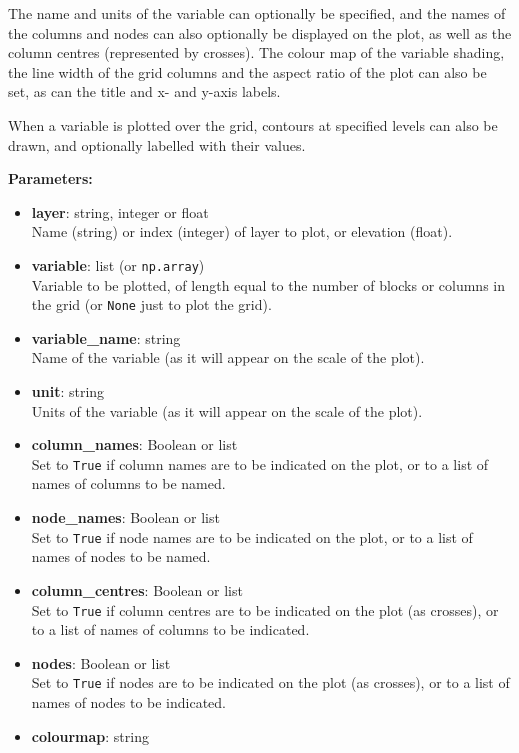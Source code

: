 The name and units of the variable can optionally be specified, and the names of the columns and nodes can also optionally be displayed on the plot, as well as the column centres (represented by crosses).  The colour map of the variable shading, the line width of the grid columns and the aspect ratio of the plot can also be set, as can the title and x- and y-axis labels.

When a variable is plotted over the grid, contours at specified levels can also be drawn, and optionally labelled with their values.

\textbf{Parameters:}
\begin{itemize}
\item \textbf{layer}: string, integer or float\\
  Name (string) or index (integer) of layer to plot, or elevation (float).
\item \textbf{variable}: list (or \texttt{np.array})\\
  Variable to be plotted, of length equal to the number of blocks or columns in the grid (or \texttt{None} just to plot the grid).
\item \textbf{variable\_name}: string\\
  Name of the variable (as it will appear on the scale of the plot).
\item \textbf{unit}: string\\
  Units of the variable (as it will appear on the scale of the plot).
\item \textbf{column\_names}: Boolean or list\\
  Set to \texttt{True} if column names are to be indicated on the plot, or to a list of names of columns to be named.
\item \textbf{node\_names}: Boolean or list\\
  Set to \texttt{True} if node names are to be indicated on the plot, or to a list of names of nodes to be named.
\item \textbf{column\_centres}: Boolean or list\\
  Set to \texttt{True} if column centres are to be indicated on the plot (as crosses), or to a list of names of columns to be indicated.
\item \textbf{nodes}: Boolean or list\\
  Set to \texttt{True} if nodes are to be indicated on the plot (as crosses), or to a list of names of nodes to be indicated.
\item \textbf{colourmap}: string\\

\end{itemize}
